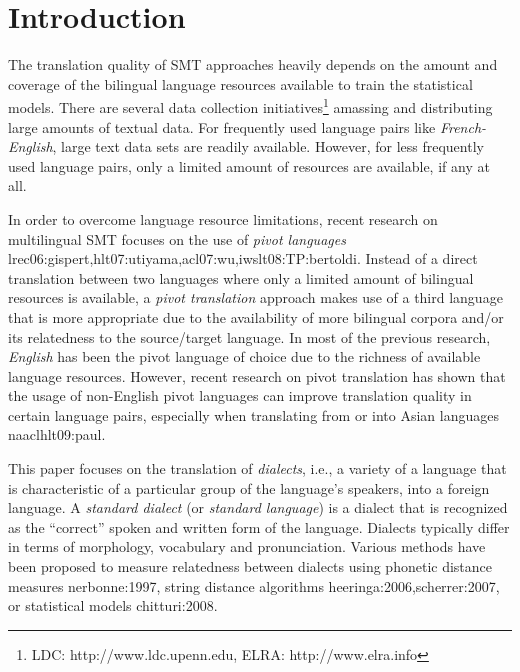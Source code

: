 \documentclass[english]{jnlp_1.4}
\renewcommand{\shortcite}{}
\begin{document}
\maketitle


\section{Introduction}
\label{sec:intro}

 The translation quality of SMT approaches heavily depends on the amount and coverage of the bilingual language
 resources available to train the statistical models.
 There are several data collection initiatives\footnote{LDC: http://www.ldc.upenn.edu, ELRA: http://www.elra.info}
 amassing and distributing large amounts of textual data.
 For frequently used language pairs like {\em French-English}, large text data sets are readily available. 
 However, for less frequently used language pairs, only a limited amount of resources are available, if any at all.

 In order to overcome language resource limitations, recent research on multilingual SMT
 focuses on the use of {\em pivot languages} \shortcite{lrec06:gispert,hlt07:utiyama,acl07:wu,iwslt08:TP:bertoldi}.
 Instead of a direct translation between two languages where only a limited amount of bilingual resources is available,
 a {\em pivot translation} approach makes use of a third language that is more appropriate due to the availability
 of more bilingual corpora and/or its relatedness to the source/target language.
 In most of the previous research, {\em English} has been the pivot language of choice due to the richness
 of available language resources. However, recent research on pivot translation has shown that
 the usage of non-English pivot languages can improve translation quality in certain language pairs,
 especially when translating from or into Asian languages \shortcite{naaclhlt09:paul}.

 This paper focuses on the translation of {\em dialects}, i.e., a variety of a language that is characteristic of a particular
 group of the language's speakers, into a foreign language. A {\em standard dialect} (or {\em standard language})
 is a dialect that is recognized as the ``correct'' spoken and written form of the language.
 Dialects typically differ in terms of morphology, vocabulary and pronunciation.
 Various methods have been proposed to measure relatedness between dialects using phonetic distance measures \shortcite{nerbonne:1997}, 
 string distance algorithms \shortcite{heeringa:2006,scherrer:2007}, or statistical models \shortcite{chitturi:2008}.
\end{document}
